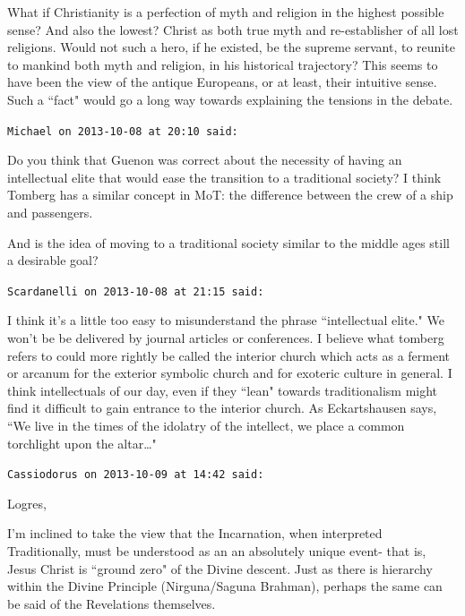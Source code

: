 \begin{footnotesize}
\begin{sffamily}
What if Christianity is a perfection of myth and religion in the highest possible sense? And also the lowest? Christ as both true myth and re-establisher of all lost religions. Would not such a hero, if he existed, be the supreme servant, to reunite to mankind both myth and religion, in his historical trajectory? This seems to have been the view of the antique Europeans, or at least, their intuitive sense. Such a ``fact" would go a long way towards explaining the tensions in the debate.


\hfill

\texttt{Michael on 2013-10-08 at 20:10 said: }

Do you think that Guenon was correct about the necessity of having an intellectual elite that would ease the transition to a traditional society? I think Tomberg has a similar concept in MoT: the difference between the crew of a ship and passengers. 

And is the idea of moving to a traditional society similar to the middle ages still a desirable goal?


\hfill

\texttt{Scardanelli on 2013-10-08 at 21:15 said: }

I think it's a little too easy to misunderstand the phrase ``intellectual elite." We won't be be delivered by journal articles or conferences. I believe what tomberg refers to could more rightly be called the interior church which acts as a ferment or arcanum for the exterior symbolic church and for exoteric culture in general. I think intellectuals of our day, even if they ``lean" towards traditionalism might find it difficult to gain entrance to the interior church. As Eckartshausen says, ``We live in the times of the idolatry of the intellect, we place a common torchlight upon the altar…"


\hfill

\texttt{Cassiodorus on 2013-10-09 at 14:42 said: }

Logres,

I'm inclined to take the view that the Incarnation, when interpreted Traditionally, must be understood as an an absolutely unique event- that is, Jesus Christ is ``ground zero" of the Divine descent. Just as there is hierarchy within the Divine Principle (Nirguna/Saguna Brahman), perhaps the same can be said of the Revelations themselves.


\hfill


\hfill


\end{sffamily}\end{footnotesize}
